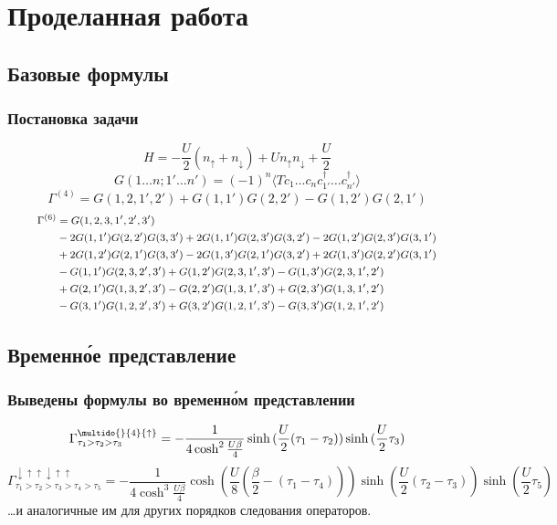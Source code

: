 \documentclass{beamer}
\begin{document}
\section{Проделанная работа}
\subsection{Базовые формулы}
\begin{frame}
 \frametitle{Постановка задачи}
 \pause
 \[ H = -\frac{U}{2} \left(n_{\uparrow}+n_{\downarrow}\right) + U n_{\uparrow} n_{\downarrow} + \frac{U}{2} \] \pause
 \[ G(1\dots n;1'\dots n') = (-1)^n \langle T c_1\dots c_n c_{1'}^\dagger\dots c_{n'}^\dagger\rangle \] \pause
 \[ \Gamma^{(4)} = G(1,2,1',2')+G(1,1')G(2,2')-G(1,2')G(2,1') \] \pause
 \[ \footnotesize\begin{aligned}
      \Gamma^{(6)} & = G(1, 2, 3, 1', 2', 3') \\
      & -2 G(1, 1') G(2, 2') G(3, 3') 
      +2 G(1, 1') G(2, 3') G(3, 2')
      -2 G(1, 2') G(2, 3') G(3, 1') \\ 
      & +2 G(1, 2') G(2, 1') G(3, 3')
      -2 G(1, 3') G(2, 1') G(3, 2')
      +2 G(1, 3') G(2, 2') G(3, 1') \\
      & -G(1, 1') G(2, 3, 2', 3')
      +G(1, 2') G(2, 3, 1', 3')
      -G(1, 3') G(2, 3, 1', 2') \\
      & +G(2, 1') G(1, 3, 2', 3')
      -G(2, 2') G(1, 3, 1', 3')
      +G(2, 3') G(1, 3, 1', 2') \\
      & -G(3, 1') G(1, 2, 2', 3')
      +G(3, 2') G(1, 2, 1', 3')
      -G(3, 3') G(1, 2, 1', 2')
    \end{aligned} 
 \]
\end{frame}

\subsection{Временн\'{о}е представление}
\begin{frame}
 \frametitle{Выведены формулы во временн\'{о}м представлении}
 \pause 
 \[ \Gamma_{\tau_1>\tau_2>\tau_3}^{\multido{}{4}{\uparrow}} = -\frac{1}{4\cosh^2{\frac{U\beta}{4}}}\sinh{(\frac{U}{2}(\tau_1-\tau_2))}\sinh{(\frac{U}{2}\tau_3)} \]
 \pause
 \scriptsize\[ \Gamma_{\tau_1>\tau_2>\tau_3>\tau_4>\tau_5}^{\downarrow\uparrow\uparrow\downarrow\uparrow\uparrow} = 
    -\frac{1}{4\cosh^3{\frac{U\beta}{4}}}\cosh{(\frac{U}{8}(\frac{\beta}{2}-(\tau_1-\tau_4)))}
      \sinh{(\frac{U}{2}(\tau_2-\tau_3))}\sinh{(\frac{U}{2}\tau_5)} \]
 \pause
  \normalsize\dots и аналогичные им для других порядков следования операторов.
\end{frame}
\end{document}
